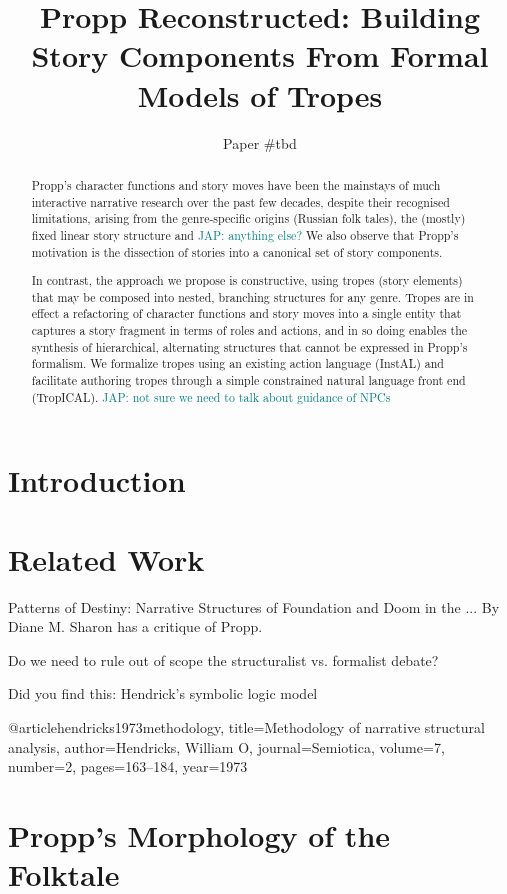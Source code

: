 \documentclass{article}
\title{Propp Reconstructed: Building Story Components From Formal Models of Tropes}
\author{Paper \#tbd}
\newcommand{\jnote}[1]{\textcolor{teal}{JAP: #1}}
\begin{document}
\maketitle

\begin{abstract}
Propp's character functions and story moves have been the mainstays of much interactive narrative research over the past few decades, despite their recognised limitations, arising from the genre-specific origins (Russian folk tales), the (mostly) fixed linear story structure and \jnote{anything else?} We also observe that Propp's motivation is the dissection of stories into a canonical set of story components.

In contrast, the approach we propose is constructive, using tropes (story elements) that may be composed into nested, branching structures for any genre. Tropes are in effect a refactoring of character functions and story moves into a single entity that captures a story fragment in terms of roles and actions, and in so doing enables the synthesis of hierarchical, alternating structures that cannot be expressed in Propp's formalism. We formalize tropes using an existing action language (InstAL) and facilitate authoring tropes through a simple constrained natural language front end (TropICAL). \jnote{not sure we need to talk about guidance of NPCs}
\end{abstract}

\section{Introduction}

\section{Related Work}

Patterns of Destiny: Narrative Structures of Foundation and Doom in the ...
By Diane M. Sharon has a critique of Propp.

Do we need to rule out of scope the structuralist vs. formalist debate?

Did you find this: Hendrick's symbolic logic model

@article{hendricks1973methodology,
  title={Methodology of narrative structural analysis},
  author={Hendricks, William O},
  journal={Semiotica},
  volume={7},
  number={2},
  pages={163--184},
  year={1973}
}

\section{Propp's Morphology of the Folktale}
\end{document}
